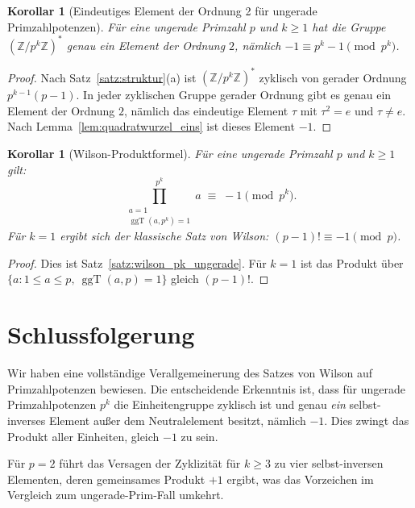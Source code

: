 \documentclass[12pt,a4paper]{amsart}
\newtheorem{korollar}[theorem]{Korollar}
\theoremstyle{definition}
\newcommand{\Z}{\mathbb{Z}}
\DeclareMathOperator{\ggT}{ggT}
\begin{document}
\begin{korollar}[Eindeutiges Element der Ordnung 2 für ungerade Primzahlpotenzen]%
  \label{kor:eindeutig_ordnung2}
  Für eine ungerade Primzahl $p$ und $k \geq 1$ hat die Gruppe $(\Z/p^k\Z)^*$
  genau ein Element der Ordnung $2$, nämlich $-1 \equiv p^k - 1 \pmod{p^k}$.
\end{korollar}

\begin{proof}
  Nach Satz~\ref{satz:struktur}(a) ist $(\Z/p^k\Z)^*$ zyklisch von gerader
  Ordnung $p^{k-1}(p-1)$. In jeder zyklischen Gruppe gerader Ordnung gibt es
  genau ein Element der Ordnung $2$, nämlich das eindeutige Element $\tau$
  mit $\tau^2 = e$ und $\tau \neq e$. Nach Lemma~\ref{lem:quadratwurzel_eins}
  ist dieses Element $-1$.
\end{proof}

\begin{korollar}[Wilson-Produktformel]\label{kor:wilson_formel}
  Für eine ungerade Primzahl $p$ und $k \geq 1$ gilt:
  \[
    \prod_{\substack{a=1\\\ggT(a,p^k)=1}}^{p^k} a \;\equiv\; -1 \pmod{p^k}.
  \]
  Für $k = 1$ ergibt sich der klassische Satz von Wilson: $(p-1)! \equiv -1 \pmod{p}$.
\end{korollar}

\begin{proof}
  Dies ist Satz~\ref{satz:wilson_pk_ungerade}. Für $k = 1$ ist das Produkt
  über $\{a : 1 \leq a \leq p,\ \ggT(a,p) = 1\}$ gleich $(p-1)!$.
\end{proof}

\section{Schlussfolgerung}

Wir haben eine vollständige Verallgemeinerung des Satzes von Wilson auf
Primzahlpotenzen bewiesen. Die entscheidende Erkenntnis ist, dass für ungerade
Primzahlpotenzen $p^k$ die Einheitengruppe zyklisch ist und genau \emph{ein}
selbst-inverses Element außer dem Neutralelement besitzt, nämlich $-1$.
Dies zwingt das Produkt aller Einheiten, gleich $-1$ zu sein.

Für $p = 2$ führt das Versagen der Zyklizität für $k \geq 3$ zu vier
selbst-inversen Elementen, deren gemeinsames Produkt $+1$ ergibt, was
das Vorzeichen im Vergleich zum ungerade-Prim-Fall umkehrt.
\end{document}
